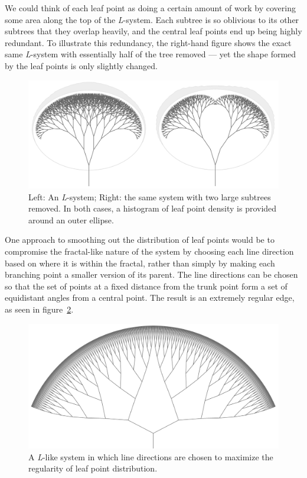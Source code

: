 \documentclass[20pt,]{extarticle}
\begin{document}
We could think of each leaf point as doing a certain amount of work by
covering some area along the top of the \emph{L}-system. Each subtree is
so oblivious to its other subtrees that they overlap heavily, and the
central leaf points end up being highly redundant. To illustrate this
redundancy, the right-hand figure shows the exact same \emph{L}-system
with essentially half of the tree removed --- yet the shape formed by
the leaf points is only slightly changed.

\begin{figure}
\centering
\includegraphics{images/ellsystem2.png}
\caption{Left: An \emph{L}-system; Right: the same system with two large
subtrees removed. In both cases, a histogram of leaf point density is
provided around an outer ellipse.}\label{fig:ellsystem}
\end{figure}

One approach to smoothing out the distribution of leaf points would be
to compromise the fractal-like nature of the system by choosing each
line direction based on where it is within the fractal, rather than
simply by making each branching point a smaller version of its parent.
The line directions can be chosen so that the set of points at a fixed
distance from the trunk point form a set of equidistant angles from a
central point. The result is an extremely regular edge, as seen in
figure~\ref{fig:well_dist}.

\begin{figure}
\centering
\includegraphics{images/well_distributed_ell_like_system.png}
\caption{A \emph{L}-like system in which line directions are chosen to
maximize the regularity of leaf point
distribution.}\label{fig:well_dist}
\end{figure}
\end{document}
